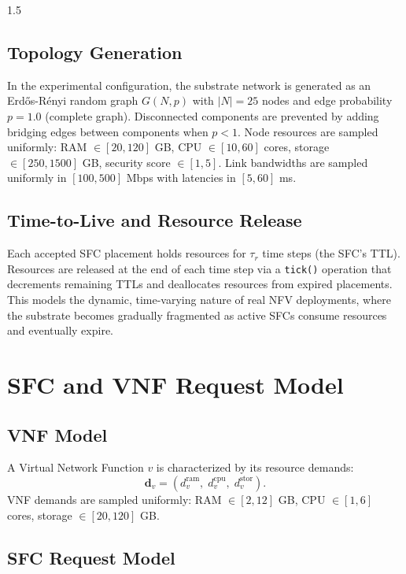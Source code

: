 \documentclass[A4paper,12pt]{report}
\theoremstyle{plain}
\theoremstyle{definition}
\theoremstyle{remark}
\numberwithin{equation}{section}
\begin{document}
\begin{spacing}{1.5}
\subsection{Topology Generation}

In the experimental configuration, the substrate network is generated as an Erd\H{o}s-R\'enyi random graph $G(N, p)$ with $|N| = 25$ nodes and edge probability $p = 1.0$ (complete graph). Disconnected components are prevented by adding bridging edges between components when $p < 1$. Node resources are sampled uniformly: RAM $\in [20, 120]$ GB, CPU $\in [10, 60]$ cores, storage $\in [250, 1500]$ GB, security score $\in [1, 5]$. Link bandwidths are sampled uniformly in $[100, 500]$ Mbps with latencies in $[5, 60]$ ms.

\subsection{Time-to-Live and Resource Release}

Each accepted SFC placement holds resources for $\tau_r$ time steps (the SFC's TTL). Resources are released at the end of each time step via a \texttt{tick()} operation that decrements remaining TTLs and deallocates resources from expired placements. This models the dynamic, time-varying nature of real NFV deployments, where the substrate becomes gradually fragmented as active SFCs consume resources and eventually expire.

\section{SFC and VNF Request Model}

\subsection{VNF Model}

A Virtual Network Function $v$ is characterized by its resource demands:
\begin{equation}
\mathbf{d}_v = \left(d_v^{\text{ram}},\; d_v^{\text{cpu}},\; d_v^{\text{stor}}\right).
\end{equation}
VNF demands are sampled uniformly: RAM $\in [2, 12]$ GB, CPU $\in [1, 6]$ cores, storage $\in [20, 120]$ GB.

\subsection{SFC Request Model}


\end{spacing}
\end{document}
